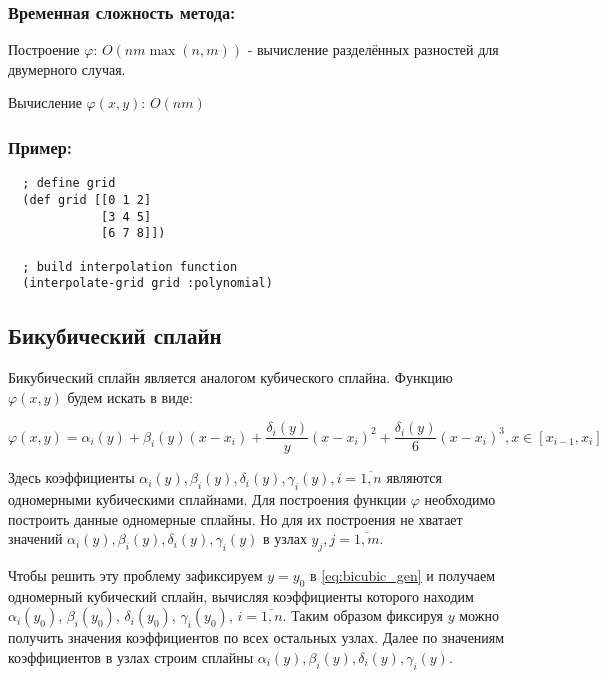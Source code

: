 \subsubsection{Временная сложность метода:}

Построение $\varphi$: $O(n m \max(n, m))$ - вычисление разделённых разностей для двумерного случая.

Вычисление $\varphi(x, y)$: $O(n m)$

\subsubsection{Пример:}

\begin{verbatim}
  ; define grid
  (def grid [[0 1 2]
             [3 4 5]
             [6 7 8]])

  ; build interpolation function
  (interpolate-grid grid :polynomial)
\end{verbatim}



\subsection{Бикубический сплайн}

Бикубический сплайн является аналогом кубического сплайна. Функцию $\varphi(x, y)$ будем искать в виде:

\begin{equation} \label{eq:bicubic_gen}
  \varphi(x, y) = \alpha_i(y) + \beta_i(y)(x - x_i) + \frac{\delta_i(y)}{y}(x - x_i)^2 + \frac{\delta_i(y)}{6}(x - x_i)^3, x \in [x_{i-1}, x_i]
\end{equation}

Здесь коэффициенты $\alpha_i(y), \beta_i(y), \delta_i(y), \gamma_i(y), i = \overline{1, n}$ являются одномерными кубическими сплайнами. Для построения функции $\varphi$ необходимо построить данные одномерные сплайны. Но для их построения не хватает значений $\alpha_i(y), \beta_i(y), \delta_i(y), \gamma_i(y)$ в узлах $y_j, j = \overline{1,m}$.

Чтобы решить эту проблему зафиксируем $y = y_0$ в \eqref{eq:bicubic_gen} и получаем одномерный кубический сплайн, вычисляя коэффициенты которого находим $\alpha_i(y_0)$, $\beta_i(y_0)$, $\delta_i(y_0)$, $\gamma_i(y_0)$, $i = \overline{1, n}$. Таким образом фиксируя $y$ можно получить значения коэффициентов по всех остальных узлах. Далее по значениям коэффициентов в узлах строим сплайны $\alpha_i(y), \beta_i(y), \delta_i(y), \gamma_i(y)$.

